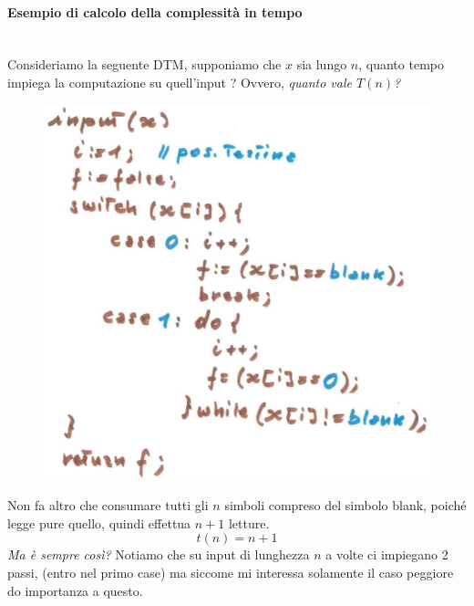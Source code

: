 \documentclass{article}
\begin{document}
\paragraph{Esempio di calcolo della complessità in tempo}\mbox{}\\
Consideriamo la seguente DTM, supponiamo che $x$ sia lungo $n$, quanto
tempo impiega la computazione su quell'input ? Ovvero, \textit{quanto
    vale $T(n)$?}
\begin{figure}
    \centering
    \includegraphics[scale=0.5]{images/pseudo_DTM.png}
\end{figure}
Non fa altro che consumare tutti gli $n$ simboli compreso del simbolo blank,
poiché legge pure quello, quindi effettua $n+1$ letture.
$$t(n)=n+1$$
\textit{Ma è sempre così?} Notiamo che su input di lunghezza $n$ a volte
ci impiegano 2 passi, (entro nel primo case) ma siccome mi interessa
solamente il caso peggiore do importanza a questo.
\end{document}
